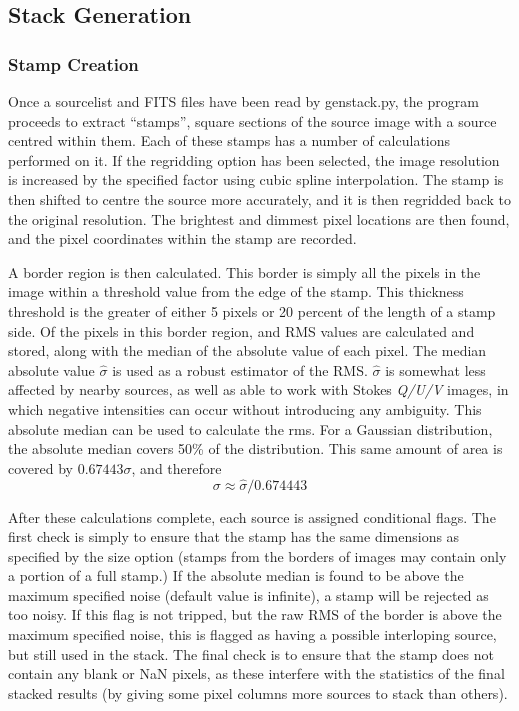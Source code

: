 \documentclass{article}
\begin{document}
\subsection{Stack Generation}

\subsubsection{Stamp Creation}
Once a sourcelist and FITS files have been read by genstack.py, the program 
proceeds to extract ``stamps'', square sections of the source image with a 
source centred within them.  Each of these stamps has a number of calculations 
performed on it.  If the regridding option has been selected, the image 
resolution is increased by the specified factor using cubic spline 
interpolation.  The stamp is then shifted to centre the source more 
accurately, and it is then regridded back to the original resolution. The 
brightest and dimmest pixel locations are then found, and the pixel coordinates
within the stamp are recorded. \par

A border region is then calculated.  This border is simply all the pixels in 
the image within a threshold value from the edge of the stamp. This thickness 
threshold is the greater of either 5 pixels or 20 percent of the length of a 
stamp side. Of the pixels in this border region, and RMS values are 
calculated and stored, along with the median of the absolute value of each 
pixel. The median absolute value $\hat\sigma$ is used as a robust estimator of 
the RMS.  $\hat\sigma$ is somewhat less affected by nearby sources, as well as 
able to work with Stokes \emph{Q/U/V} images, in which negative intensities can occur without introducing any ambiguity.  This absolute median can be used to 
calculate the rms.  For a Gaussian distribution, the absolute median 
covers 50\% of the distribution.  This same amount of area is covered by 
$0.67443\sigma$, and therefore
$$\sigma \approx \hat\sigma/0.674443$$
\par

After these calculations complete, each source is assigned conditional flags.
The first check is simply to ensure that the stamp has the same dimensions as
specified by the size option (stamps from the borders of images may contain only
a portion of a full stamp.) If the absolute median is found to be above 
the maximum specified noise (default value is infinite), a stamp will be 
rejected as too noisy.  If this flag is not tripped, but the raw RMS of the 
border is above the maximum specified noise, this is flagged as having a 
possible interloping source, but still used in the stack.  The final check is to
ensure that the stamp does not contain any blank or NaN pixels, as these 
interfere with the statistics of the final stacked results (by giving some
pixel columns more sources to stack than others).\par
\end{document}
